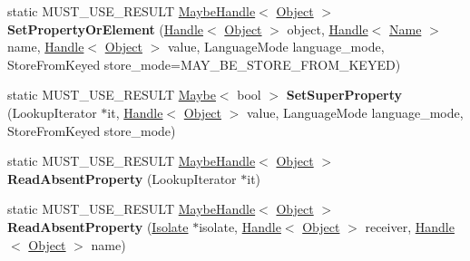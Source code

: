 \begin{DoxyCompactItemize}
\item 
static M\+U\+S\+T\+\_\+\+U\+S\+E\+\_\+\+R\+E\+S\+U\+LT \hyperlink{classv8_1_1internal_1_1_maybe_handle}{Maybe\+Handle}$<$ \hyperlink{classv8_1_1internal_1_1_object}{Object} $>$ {\bfseries Set\+Property\+Or\+Element} (\hyperlink{classv8_1_1internal_1_1_handle}{Handle}$<$ \hyperlink{classv8_1_1internal_1_1_object}{Object} $>$ object, \hyperlink{classv8_1_1internal_1_1_handle}{Handle}$<$ \hyperlink{classv8_1_1internal_1_1_name}{Name} $>$ name, \hyperlink{classv8_1_1internal_1_1_handle}{Handle}$<$ \hyperlink{classv8_1_1internal_1_1_object}{Object} $>$ value, Language\+Mode language\+\_\+mode, Store\+From\+Keyed store\+\_\+mode=M\+A\+Y\+\_\+\+B\+E\+\_\+\+S\+T\+O\+R\+E\+\_\+\+F\+R\+O\+M\+\_\+\+K\+E\+Y\+ED)\hypertarget{classv8_1_1internal_1_1_object_a338e15564dcaa0751f22757565d2ef40}{}\label{classv8_1_1internal_1_1_object_a338e15564dcaa0751f22757565d2ef40}

\item 
static M\+U\+S\+T\+\_\+\+U\+S\+E\+\_\+\+R\+E\+S\+U\+LT \hyperlink{classv8_1_1_maybe}{Maybe}$<$ bool $>$ {\bfseries Set\+Super\+Property} (Lookup\+Iterator $\ast$it, \hyperlink{classv8_1_1internal_1_1_handle}{Handle}$<$ \hyperlink{classv8_1_1internal_1_1_object}{Object} $>$ value, Language\+Mode language\+\_\+mode, Store\+From\+Keyed store\+\_\+mode)\hypertarget{classv8_1_1internal_1_1_object_a09d4b552aba9f8da356d2273fd241156}{}\label{classv8_1_1internal_1_1_object_a09d4b552aba9f8da356d2273fd241156}

\item 
static M\+U\+S\+T\+\_\+\+U\+S\+E\+\_\+\+R\+E\+S\+U\+LT \hyperlink{classv8_1_1internal_1_1_maybe_handle}{Maybe\+Handle}$<$ \hyperlink{classv8_1_1internal_1_1_object}{Object} $>$ {\bfseries Read\+Absent\+Property} (Lookup\+Iterator $\ast$it)\hypertarget{classv8_1_1internal_1_1_object_ac2dca15589c9c2f7da7dee78f4a0a335}{}\label{classv8_1_1internal_1_1_object_ac2dca15589c9c2f7da7dee78f4a0a335}

\item 
static M\+U\+S\+T\+\_\+\+U\+S\+E\+\_\+\+R\+E\+S\+U\+LT \hyperlink{classv8_1_1internal_1_1_maybe_handle}{Maybe\+Handle}$<$ \hyperlink{classv8_1_1internal_1_1_object}{Object} $>$ {\bfseries Read\+Absent\+Property} (\hyperlink{classv8_1_1internal_1_1_isolate}{Isolate} $\ast$isolate, \hyperlink{classv8_1_1internal_1_1_handle}{Handle}$<$ \hyperlink{classv8_1_1internal_1_1_object}{Object} $>$ receiver, \hyperlink{classv8_1_1internal_1_1_handle}{Handle}$<$ \hyperlink{classv8_1_1internal_1_1_object}{Object} $>$ name)\hypertarget{classv8_1_1internal_1_1_object_a2912dd7d89e7b7fb29578591792a7012}{}\label{classv8_1_1internal_1_1_object_a2912dd7d89e7b7fb29578591792a7012}


\end{DoxyCompactItemize}
